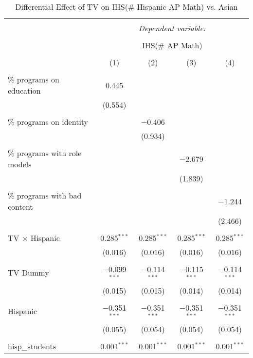 
\begin{table}[!htbp] \centering 
  \caption{Differential Effect of TV on IHS(\# Hispanic AP Math) vs. Asian} 
  \label{} 
\begin{tabular}{@{\extracolsep{-2pt}}lcccc} 
\\[-1.8ex]\hline 
\hline \\[-1.8ex] 
 & \multicolumn{4}{c}{\textit{Dependent variable:}} \\ 
\cline{2-5} 
\\[-1.8ex] & \multicolumn{4}{c}{IHS(\# AP Math)} \\ 
\\[-1.8ex] & (1) & (2) & (3) & (4)\\ 
\hline \\[-1.8ex] 
 \% programs on education & 0.445 &  &  &  \\ 
  & (0.554) &  &  &  \\ 
  & & & & \\ 
 \% programs on identity &  & $-$0.406 &  &  \\ 
  &  & (0.934) &  &  \\ 
  & & & & \\ 
 \% programs with role models &  &  & $-$2.679 &  \\ 
  &  &  & (1.839) &  \\ 
  & & & & \\ 
 \% programs with bad content &  &  &  & $-$1.244 \\ 
  &  &  &  & (2.466) \\ 
  & & & & \\ 
 TV $\times$ Hispanic & 0.285$^{***}$ & 0.285$^{***}$ & 0.285$^{***}$ & 0.285$^{***}$ \\ 
  & (0.016) & (0.016) & (0.016) & (0.016) \\ 
  & & & & \\ 
 TV Dummy & $-$0.099$^{***}$ & $-$0.114$^{***}$ & $-$0.115$^{***}$ & $-$0.114$^{***}$ \\ 
  & (0.015) & (0.015) & (0.014) & (0.014) \\ 
  & & & & \\ 
 Hispanic & $-$0.351$^{***}$ & $-$0.351$^{***}$ & $-$0.351$^{***}$ & $-$0.351$^{***}$ \\ 
  & (0.055) & (0.054) & (0.054) & (0.054) \\ 
  & & & & \\ 
 hisp\_students & 0.001$^{***}$ & 0.001$^{***}$ & 0.001$^{***}$ & 0.001$^{***}$ \\ 

\end{tabular}
\end{table}
